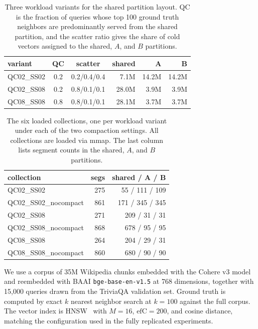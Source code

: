 \begin{table}[t]
\centering
\caption{Three workload variants for the shared partition layout.
$\mathrm{QC}$ is the fraction of queries whose top 100 ground truth
neighbors are predominantly served from the shared partition, and
the scatter ratio gives the share of cold vectors assigned to the
shared, $A$, and $B$ partitions.}
\label{tab:wiki-variants}
\small
\setlength{\tabcolsep}{4pt}
\begin{tabular}{lccrrr}
\toprule
variant & QC & scatter & shared & A & B \\
\midrule
QC02\_SS02 & 0.2 & 0.2/0.4/0.4 & 7.1M  & 14.2M & 14.2M \\
QC02\_SS08 & 0.2 & 0.8/0.1/0.1 & 28.0M & 3.9M  & 3.9M  \\
QC08\_SS08 & 0.8 & 0.8/0.1/0.1 & 28.1M & 3.7M  & 3.7M  \\
\bottomrule
\end{tabular}
\end{table}

\begin{table}[t]
\centering
\caption{The six loaded collections, one per workload variant
under each of the two compaction settings. All collections are
loaded via mmap. The last column lists segment counts in the
shared, $A$, and $B$ partitions.}
\label{tab:wiki-collections}
\small
\setlength{\tabcolsep}{4pt}
\begin{tabular}{lrr}
\toprule
collection & segs & shared / A / B \\
\midrule
QC02\_SS02            & 275 & 55  / 111 / 109 \\
QC02\_SS02\_nocompact & 861 & 171 / 345 / 345 \\
QC02\_SS08            & 271 & 209 / 31  / 31  \\
QC02\_SS08\_nocompact & 868 & 678 / 95  / 95  \\
QC08\_SS08            & 264 & 204 / 29  / 31  \\
QC08\_SS08\_nocompact & 860 & 680 / 90  / 90  \\
\bottomrule
\end{tabular}
\end{table}

 We use a corpus of 35M Wikipedia chunks embedded
with the Cohere v3 model and reembedded with BAAI
\texttt{bge-base-en-v1.5} at 768 dimensions, together with 15{,}000
queries drawn from the TriviaQA validation set. Ground truth is
computed by exact $k$ nearest neighbor search at $k{=}100$ against
the full corpus. The vector index is HNSW~\cite{malkov2018hnsw} with
$M{=}16$, $\text{efC}{=}200$, and cosine distance, matching the
configuration used in the fully replicated experiments.

